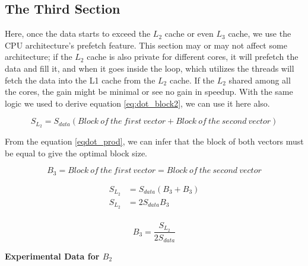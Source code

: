 \subsection{The Third Section}

Here, once the data starts to exceed the $L_2$ cache or even $L_3$ cache, 
we use the CPU architecture's prefetch feature. 
This section may or may not affect some architecture; 
if the $L_2$ cache is also private for different cores, 
it will prefetch the data and fill it, and when it goes 
inside the loop, which utilizes the threads will fetch 
the data into the L1 cache from the $L_2$ cache. 
If the $L_2$ shared among all the cores, the gain might be 
minimal or see no gain in speedup. With the same logic 
we used to derive equation \ref{eq:dot_block2}, we can use it here also.

\[S_{L_2} = S_{data}(Block\ of\ the\ first\ vector + Block\ of\ the\ second\ vector)\]

From the equation \ref{eqdot_prod}, we can infer that the block of both vectors must
be equal to give the optimal block size.

\[B_3 = Block\ of\ the\ first\ vector = Block\ of\ the\ second\ vector\]

\begin{align*}
    S_{L_2} &= S_{data}(B_3 + B_3)\\
    S_{L_2} &= 2S_{data}B_3\\
\end{align*}

\begin{equation}
    B_3 = \frac{S_{L_2}}{2S_{data}}
    \label{eq:dot_block3}
\end{equation}

\newpage
\textbf{Experimental Data for $B_2$}

\begin{figure}[htb]
    \centering
    \label{fig:dot_Stuning_block3}
    \qquad
    \label{fig:dot_Dtuning_block3}
\end{figure}

